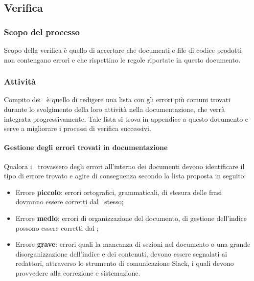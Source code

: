 \documentclass[../NormeDiProgetto.tex]{subfiles}
\begin{document}
		\subsection{Verifica}
			\subsubsection{Scopo del processo}
				Scopo della verifica è quello di accertare che documenti e file di codice prodotti non
				contengano errori e che rispettino le regole riportate in questo documento.
			\subsubsection{Attività}
				Compito dei \verificatori\ è quello di redigere una lista con gli errori più comuni trovati
				durante lo svolgimento della loro attività nella documentazione, che verrà integrata
				progressivamente. Tale lista si trova in appendice a questo documento e serve a
				migliorare i processi di verifica successivi.
				\paragraph{Gestione degli errori trovati in documentazione\\}
					Qualora i \verificatori\ trovassero degli errori all'interno dei documenti devono
					identificare il tipo di errore trovato e agire di conseguenza
					secondo la lista proposta in seguito:
					\begin{itemize}
						\item Errore \textbf{piccolo}: errori ortografici, grammaticali, di stesura delle
						frasi dovranno essere corretti dal \verificatore\ stesso;
						\item Errore \textbf{medio}: errori di organizzazione del documento, di gestione
						dell'indice possono essere corretti dal \verificatore;
						\item Errore \textbf{grave}: errori quali la mancanza di sezioni nel documento o una
						grande disorganizzazione dell'indice e dei contenuti, devono essere segnalati ai
						redattori, attraverso lo strumento di comunicazione Slack, i quali devono
						provvedere alla correzione e sistemazione.
					\end{itemize}
\end{document}
